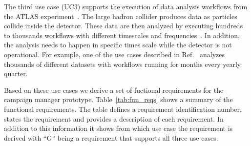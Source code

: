 The third use case (UC3) supports the execution of data analysis workflows from the ATLAS experiment~\cite{atlas}.
The large hadron collider produces data as particles collide inside the detector.
These data are then analyzed by executing hundreds to thousands workflows with different timescales and frequencies~\cite{borodin2015big}.
In addition, the analysis needs to happen in specific times scale while the detector is not operational.
For example, one of the use cases described in Ref.~\cite{borodin2015big} analyzes thousands of different datasets with workflows running for months every yearly quarter.


Based on these use cases we derive a set of fuctional requirements for the campaign manager prototype. 
Table~\ref{tab:fun_reqs} shows a summary of the functional requirements.
The table defines a requirement identification number, states the requirement and provides a description of each requirement.
In addition to this information it shows from which use case the requirement is derived with ``G'' being a requirement that supports all three use cases. 

